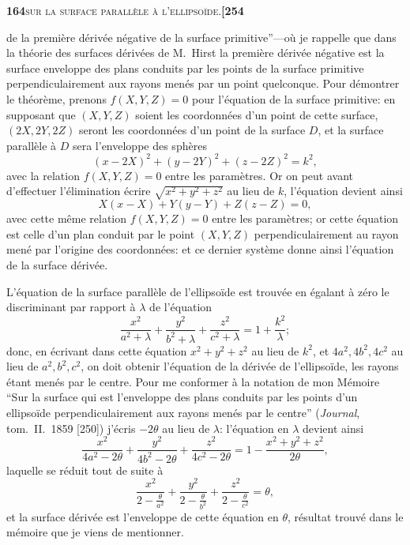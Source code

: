 \documentclass[11pt]{article}
\begin{document}
\noindent\textbf{164}\hfill\textsc{sur la surface parallèle à l'ellipsoïde.}\hfill\textbf{[254}

\medskip

\noindent de la première dérivée négative de la surface primitive''---où je rappelle que dans la théorie des surfaces dérivées de M.~Hirst la première dérivée négative est la surface enveloppe des plans conduits par les points de la surface primitive perpendiculairement aux rayons menés par un point quelconque. Pour démontrer le théorème, prenons $f(X, Y, Z) = 0$ pour l'équation de la surface primitive: en supposant que $(X, Y, Z)$ soient les coordonnées d'un point de cette surface, $(2X, 2Y, 2Z)$ seront les coordonnées d'un point de la surface $D$, et la surface parallèle à $D$ sera l'enveloppe des sphères
\[
(x - 2X)^2 + (y - 2Y)^2 + (z - 2Z)^2 = k^2,
\]
avec la relation $f(X, Y, Z) = 0$ entre les paramètres. Or on peut avant d'effectuer l'élimination écrire $\sqrt{x^2 + y^2 + z^2}$ au lieu de $k$, l'équation devient ainsi
\[
X(x - X) + Y(y - Y) + Z(z - Z) = 0,
\]
avec cette même relation $f(X, Y, Z) = 0$ entre les paramètres; or cette équation est celle d'un plan conduit par le point $(X, Y, Z)$ perpendiculairement au rayon mené par l'origine des coordonnées: et ce dernier système donne ainsi l'équation de la surface dérivée.

L'équation de la surface parallèle de l'ellipsoïde est trouvée en égalant à zéro le discriminant par rapport à $\lambda$ de l'équation
\[
\frac{x^2}{a^2 + \lambda} + \frac{y^2}{b^2 + \lambda} + \frac{z^2}{c^2 + \lambda} = 1 + \frac{k^2}{\lambda};
\]
donc, en écrivant dans cette équation $x^2 + y^2 + z^2$ au lieu de $k^2$, et $4a^2, 4b^2, 4c^2$ au lieu de $a^2, b^2, c^2$, on doit obtenir l'équation de la dérivée de l'ellipsoïde, les rayons étant menés par le centre. Pour me conformer à la notation de mon Mémoire ``Sur la surface qui est l'enveloppe des plans conduits par les points d'un ellipsoïde perpendiculairement aux rayons menés par le centre'' (\textit{Journal}, tom.~II.\ 1859 [250]) j'écris $-2\theta$ au lieu de $\lambda$: l'équation en $\lambda$ devient ainsi
\[
\frac{x^2}{4a^2 - 2\theta} + \frac{y^2}{4b^2 - 2\theta} + \frac{z^2}{4c^2 - 2\theta} = 1 - \frac{x^2 + y^2 + z^2}{2\theta},
\]
laquelle se réduit tout de suite à
\[
\frac{x^2}{2 - \tfrac{\theta}{a^2}} + \frac{y^2}{2 - \tfrac{\theta}{b^2}} + \frac{z^2}{2 - \tfrac{\theta}{c^2}} = \theta,
\]
et la surface dérivée est l'enveloppe de cette équation en $\theta$, résultat trouvé dans le mémoire que je viens de mentionner.
\end{document}
